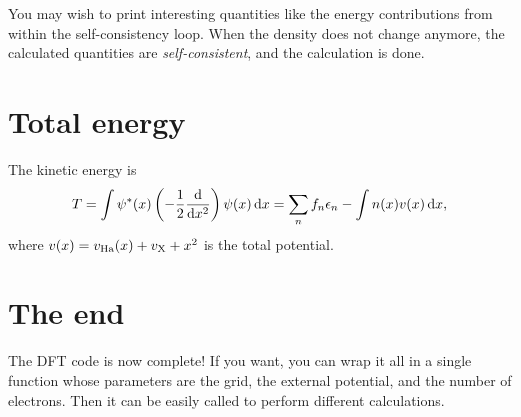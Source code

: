 \documentclass{article}
\begin{document}
\noindent You may wish to print interesting quantities like the energy
contributions from within the self-consistency loop.
When the
density does not change anymore, the calculated quantities are
\emph{self-consistent}, and the calculation is done.

\section*{Total energy}
The kinetic energy is
\begin{align}
  T = \int \psi^*(x)\left(-\frac12 \frac{\mathrm d }{\mathrm d x^2}\right) \psi(x) \,\mathrm d x
  = \sum_n f_n \epsilon_n - \int n(x) v(x) \,\mathrm d x,
\end{align}
where $v(x) = v_{\mathrm{Ha}}(x) + v_{\mathrm{X}} + x^2$ is the total potential.


\section*{The end}

The DFT code is now complete!  If you want, you can wrap it all in a
single function whose parameters are the grid, the external potential,
and the number of electrons.  Then it can be easily called to perform
different calculations.
\end{document}
